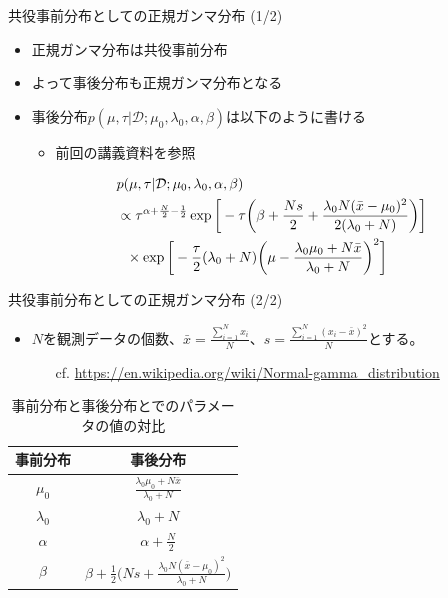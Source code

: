 \documentclass[aspectratio=169,unicode,dvipdfmx,14pt]{beamer}
\begin{document}
\begin{frame}{共役事前分布としての正規ガンマ分布 (1/2)}
\begin{itemize}
\item 正規ガンマ分布は共役事前分布
\item よって事後分布も正規ガンマ分布となる
\item 事後分布$p(\mu,\tau|\mathcal{D}; \mu_0, \lambda_0, \alpha, \beta)$は以下のように書ける
\begin{itemize}
\item 前回の講義資料を参照
\end{itemize}
\begin{align}
& p(\mu,\tau|\mathcal{D}; \mu_0, \lambda_0, \alpha, \beta) 
\notag \\ & \propto
\tau^{\alpha + \frac{N}{2} - \frac{1}{2}}
\exp \bigg[ - \tau \bigg( \beta + \frac{Ns}{2} + \frac{ \lambda_0 N (\bar{x} - \mu_0)^2 }{ 2( \lambda_0 + N ) }
\bigg) \bigg]
\notag \\ & \mbox{ \ }
\times \exp \bigg[ - \frac{\tau}{2} ( \lambda_0 + N ) \bigg( \mu - \frac{ \lambda_0 \mu_0 + N\bar{x} }{ \lambda_0 + N } \bigg)^2 \bigg]
\end{align}
\end{itemize}
\end{frame}


\begin{frame}{共役事前分布としての正規ガンマ分布 (2/2)}
\begin{itemize}
\item $N$を観測データの個数、$\bar{x} = \frac{\sum_{i=1}^N x_i}{N}$、$s=\frac{\sum_{i=1}^N (x_i - \bar{x})^2}{N}$とする。
\begin{itemize}
\item[cf.] \href{https://en.wikipedia.org/wiki/Normal-gamma_distribution}{https://en.wikipedia.org/wiki/Normal-gamma\_distribution} 
\end{itemize}
\end{itemize}
\begin{table}[t]
\caption{事前分布と事後分布とでのパラメータの値の対比}
\begin{center}
\begin{tabular}{|c|c|}
\hline
事前分布 & 事後分布 \\ \hline
$\mu_0$ & $\frac{ \lambda_0 \mu_0 + N\bar{x} }{ \lambda_0 + N }$ \\ 
$\lambda_0$ & $\lambda_0 + N$ \\
$\alpha$ & $\alpha + \frac{N}{2}$ \\
$\beta$ & $\beta + \frac{1}{2} \big( Ns + \frac{ \lambda_0 N (\bar{x} - \mu_0)^2 }{ \lambda_0 + N} \big)$ \\
\hline
\end{tabular}
\end{center}
\label{default}
\end{table}%
\end{frame}
\end{document}
